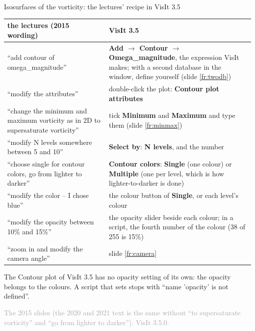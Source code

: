\documentclass[aspectratio=169,11pt]{beamer}
\newcommand{\sourcecredit}[1]{\vfill\begin{flushright}\tiny\textcolor{DarkGray}{#1}\end{flushright}}
\newcommand{\gui}[1]{\textsf{\textbf{#1}}}
\begin{document}
\begin{frame}{Isosurfaces of the vorticity: the lectures' recipe in VisIt 3.5}
\label{fr:isorecipe}
\scriptsize
\begin{tabular}{@{}L{0.42\textwidth}L{0.53\textwidth}@{}}
\toprule
the lectures (2015 wording) & VisIt 3.5 \\
\midrule
``add contour of omega\_magnitude'' & \gui{Add $\to$ Contour $\to$ Omega\_magnitude}, the expression VisIt makes; with a second database in the window, define  yourself (slide \ref{fr:twodb}) \\
``modify the attributes'' & double-click the plot: \gui{Contour plot attributes} \\
``change the minimum and maximum vorticity as in 2D to supersaturate vorticity'' & tick \gui{Minimum} and \gui{Maximum} and type them (slide \ref{fr:minmax}) \\
``modify N levels somewhere between 5 and 10'' & \gui{Select by}: \gui{N levels}, and the number \\
``choose single for contour colors, go from lighter to darker'' & \gui{Contour colors}: \gui{Single} (one colour) or \gui{Multiple} (one per level, which is how lighter-to-darker is done) \\
``modify the color -- I chose blue'' & the colour button of \gui{Single}, or each level's colour \\
``modify the opacity between 10\% and 15\%'' & the opacity slider beside each colour; in a script, the fourth number of the colour (38 of 255 is 15\%) \\
``zoom in and modify the camera angle'' & slide \ref{fr:camera} \\
\bottomrule
\end{tabular}

\vspace{2mm}
\footnotesize The Contour plot of VisIt 3.5 has no opacity setting of its own: the opacity belongs to the colours. A script that sets  stops with ``name 'opacity' is not defined''.
\sourcecredit{The 2015 slides (the 2020 and 2021 text is the same without ``to supersaturate vorticity'' and ``go from lighter to darker''). VisIt 3.5.0.}
\end{frame}
\end{document}
